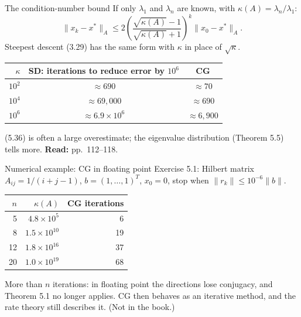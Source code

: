 \documentclass[12pt,aspectratio=169]{beamer}
\newcommand{\readpp}[1]{{\color{red!80!black}\textbf{Read:} #1}}
\begin{document}
\begin{frame}{The condition-number bound}
  If only $\lambda_1$ and $\lambda_n$ are known, with $\kappa(A)=\lambda_n/\lambda_1$:
  \begin{equation}
    \|x_k-x^*\|_A \le 2\left(\frac{\sqrt{\kappa(A)}-1}{\sqrt{\kappa(A)}+1}\right)^k\|x_0-x^*\|_A. \tag{5.36}
  \end{equation}
  Steepest descent (3.29) has the same form with $\kappa$ in place of $\sqrt\kappa$.

  \vspace{1ex}
  \centering
  \renewcommand{\arraystretch}{1.1}
  \begin{tabular}{rcc}
    \toprule
    $\kappa$ & SD: iterations to reduce error by $10^6$ & CG\\
    \midrule
    $10^2$ & $\approx 690$ & $\approx 70$\\
    $10^4$ & $\approx 69{,}000$ & $\approx 690$\\
    $10^6$ & $\approx 6.9\times10^6$ & $\approx 6{,}900$\\
    \bottomrule
  \end{tabular}

  \raggedright
  \vspace{1ex}
  (5.36) is often a large overestimate; the eigenvalue distribution (Theorem 5.5) tells more.
  \readpp{pp.~112--118.}
\end{frame}

\begin{frame}{Numerical example: CG in floating point}
  Exercise 5.1: Hilbert matrix $A_{ij}=1/(i+j-1)$, $b=(1,\dots,1)^T$, $x_0=0$,
  stop when $\|r_k\|\le10^{-6}\|b\|$.

  \vspace{1ex}
  \centering
  \renewcommand{\arraystretch}{1.1}
  \begin{tabular}{rrr}
    \toprule
    $n$ & $\kappa(A)$ & CG iterations\\
    \midrule
    5 & $4.8\times10^{5}$ & 6\\
    8 & $1.5\times10^{10}$ & 19\\
    12 & $1.8\times10^{16}$ & 37\\
    20 & $1.0\times10^{19}$ & 68\\
    \bottomrule
  \end{tabular}

  \raggedright
  \vspace{1ex}
  More than $n$ iterations: in floating point the directions lose conjugacy, and Theorem 5.1 no longer applies.
  CG then behaves as an iterative method, and the rate theory still describes it. (Not in the book.)
\end{frame}
\end{document}
